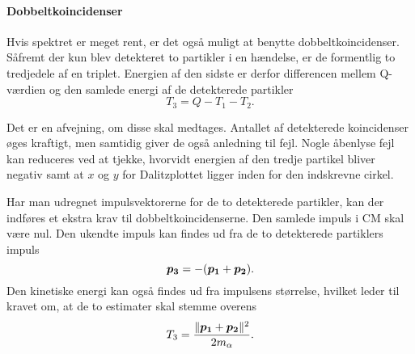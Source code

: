 \paragraph{Dobbeltkoincidenser}
\label{sec:dobbeltkoincidenser}

Hvis spektret er meget rent, er det også muligt at benytte dobbeltkoincidenser. Såfremt der kun blev
detekteret to partikler i en hændelse, er de formentlig to tredjedele af en triplet. Energien af den
sidste er derfor differencen mellem Q-værdien og den samlede energi af de detekterede partikler
\begin{equation}
  \label{eq:dobbeltE}
  T_{3} = Q - T_{1} - T_{2}.
\end{equation}

Det er en afvejning, om disse skal medtages. Antallet af detekterede koincidenser øges kraftigt, men
samtidig giver de også anledning til fejl. Nogle åbenlyse fejl kan reduceres ved at tjekke, hvorvidt
energien af den tredje partikel bliver negativ samt at $x$ og $y$ for Dalitzplottet ligger inden for
den indskrevne cirkel.

Har man udregnet impulsvektorerne for de to detekterede partikler, kan der indføres
et ekstra krav til dobbeltkoincidenserne. Den samlede impuls i CM skal være nul. Den ukendte
impuls kan findes ud fra de to detekterede partiklers impuls
\begin{equation}
  \bm{p_{3}} = -(\bm{p_{1}} + \bm{p_{2}}).
\end{equation}
Den kinetiske energi kan også findes ud fra impulsens størrelse, hvilket leder til kravet om, at de to
estimater skal stemme overens
\begin{equation}
  T_{3} = \frac{\lVert\bm{p_{1}} + \bm{p_{2}}\rVert^{2}}{2m_{\alpha}}.
\end{equation}
